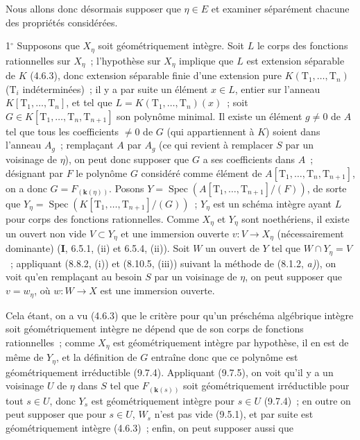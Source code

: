 Nous allons donc désormais supposer que $\eta\in E$ et examiner séparément
chacune des propriétés considérées.

1$^\circ$ Supposons que $X_\eta$ soit géométriquement intègre. Soit $L$ le corps
des fonctions rationnelles sur $X_\eta$~; l'hypothèse sur $X_\eta$ implique que
$L$ est extension séparable de $K$ (4.6.3), donc extension séparable finie d'une
extension pure $K(\mathrm T_1,\ldots,\mathrm T_n)$ ($\mathrm T_i$
indéterminées)~; il y a par suite un élément $x\in L$, entier sur l'anneau
$K[\mathrm T_1,\ldots,\mathrm T_n]$, et tel que
$L=K(\mathrm T_1,\ldots,\mathrm T_n)(x)$~; soit
$G\in K[\mathrm T_1,\ldots,\mathrm T_n,\mathrm T_{n+1}]$ son polynôme minimal.
Il existe un élément $g\neq0$ de $A$ tel que tous les coefficients $\neq0$ de
$G$ (qui appartiennent à $K$) soient dans l'anneau $A_g$~; remplaçant $A$ par
$A_g$ (ce qui revient à remplacer $S$ par un voisinage de $\eta$), on peut donc
supposer que $G$ a ses coefficients dans $A$~; désignant par $F$ le polynôme
$G$ considéré comme élément de
$A[\mathrm T_1,\ldots,\mathrm T_n,\mathrm T_{n+1}]$, on a donc
$G=F_{(\boldsymbol{k}(\eta))}$. Posons
$Y=\operatorname{Spec}(A[\mathrm T_1,\ldots,\mathrm T_{n+1}]/(F))$, de sorte
que
$Y_\eta=\operatorname{Spec}(K[\mathrm T_1,\ldots,\mathrm T_{n+1}]/(G))$~;
$Y_\eta$ est un schéma intègre ayant $L$ pour corps des fonctions rationnelles.
Comme $X_\eta$ et $Y_\eta$ sont noethériens, il existe un ouvert non vide
$V\subset Y_\eta$ et une immersion ouverte $v:V\to X_\eta$ (nécessairement
dominante) (\textbf{I}, 6.5.1, (ii) et 6.5.4, (ii)). Soit $W$ un ouvert de $Y$
tel que $W\cap Y_\eta=V$~; appliquant (8.8.2, (i)) et (8.10.5, (iii)) suivant
la méthode de (8.1.2, \emph{a)}), on voit qu'en remplaçant au besoin $S$ par un
voisinage de $\eta$, on peut supposer que $v=w_\eta$, où $w:W\to X$ est une
immersion ouverte.

Cela étant, on a vu (4.6.3) que le critère pour qu'un préschéma algébrique
intègre soit géométriquement intègre ne dépend que de son corps de fonctions
rationnelles~; comme $X_\eta$ est géométriquement intègre par hypothèse, il en
est de même de $Y_\eta$, et la définition de $G$ entraîne donc que ce polynôme
est géométriquement irréductible (9.7.4). Appliquant (9.7.5), on voit qu'il y a
un voisinage $U$ de $\eta$ dans $S$ tel que $F_{(\boldsymbol{k}(s))}$ soit
géométriquement irréductible pour tout $s\in U$, donc $Y_s$ est géométriquement
intègre pour $s\in U$ (9.7.4)~; en outre on peut supposer que pour $s\in U$,
$W_s$ n'est pas vide (9.5.1), et par suite est géométriquement intègre (4.6.3)~;
enfin, on peut supposer aussi que

